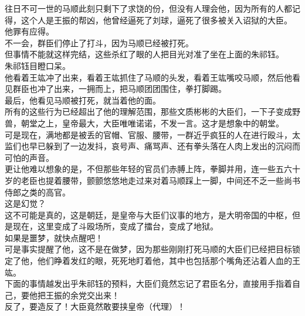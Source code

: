 \begin{multicols}{\theparacolNo}
往日不可一世的马顺此刻只剩下了求饶的份，但没有人理会他，因为所有的人都记得，这个人是王振的帮凶，他曾经逼死了刘球，逼死了很多被关入诏狱的大臣。\\

他罪有应得。\\

不一会，群臣们停止了打斗，因为马顺已经被打死。\\

但事情不能就这样完结，这些杀红了眼的人把目光对准了坐在上面的朱祁钰。\\

朱祁钰目瞪口呆。\\

他看着王竑冲了出来，看着王竑抓住了马顺的头发，看着王竑嘴咬马顺，然后他看见群臣也冲了出来，一拥而上，把马顺团团围住，拳打脚踢。\\

最后，他看见马顺被打死，就当着他的面。\\

所有的这些行为已经超出了他的理解范围，那些文质彬彬的大臣们，一下子变成野兽，朝堂之上，皇帝最大，大臣唯唯诺诺，不发一言。这才是想象中的朝堂。\\

可是现在，满地都是被丢的官帽、官服、腰带，一群近乎疯狂的人在进行殴斗，太监们也早已躲到了一边发抖，哀号声、痛骂声、还有拳头落在人肉上发出的沉闷而可怕的声音。\\

更让他难以想象的是，不但那些年轻的官员们赤膊上阵，拳脚并用，连一些五六十岁的老臣也提着腰带，颤颤悠悠地走过来对着马顺踩上一脚，中间还不乏一些尚书侍郎之类的高官。\\

这是幻觉？\\

这不可能是真的，这是朝廷，是皇帝与大臣们议事的地方，是大明帝国的中枢，但是现在，这里变成了斗殴场所，变成了擂台，变成了地狱。\\

如果是噩梦，就快点醒吧！\\

可是事实提醒了他，这不是在做梦，因为那些刚刚打死马顺的大臣们已经把目标锁定了他，他们睁着发红的眼，死死地盯着他，其中也包括那个嘴角还沾着人血的王竑。\\

下面的事情越发出乎朱祁钰的预料，大臣们竟然忘记了君臣名分，直接用手指着自己，要他把王振的余党交出来！\\

反了，要造反了！大臣竟然敢要挟皇帝（代理）！\\


\end{multicols}
